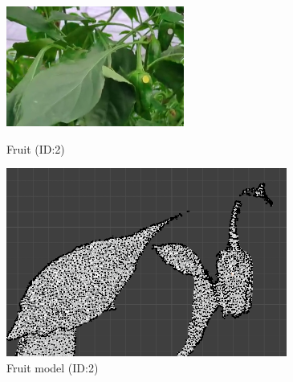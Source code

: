 \vspace{10mm}
\begin{figure}[H]
  \begin{minipage}[b]{0.49\columnwidth}
    \centering
    \includegraphics[width=\columnwidth]{images/png/ID2.png}
    \caption{Fruit (ID:2)}
    \label{Fig:id2}
  \end{minipage}
  \hspace{0.02\columnwidth}
  \begin{minipage}[b]{0.49\columnwidth}
    \centering
    \includegraphics[width=\columnwidth]{images/png/ID2model.png}
    \caption{Fruit model (ID:2)}
    \label{Fig:id2model}
  \end{minipage}
\end{figure}